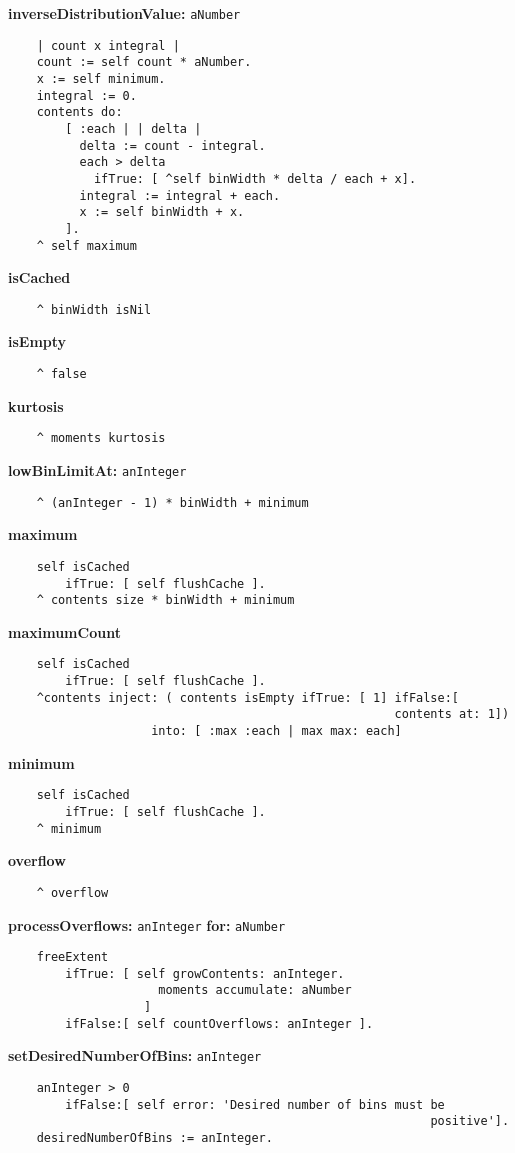 {\bf inverseDistributionValue:} {\tt aNumber}
\begin{verbatim}
    | count x integral |
    count := self count * aNumber.
    x := self minimum.
    integral := 0.
    contents do:
        [ :each | | delta |
          delta := count - integral.
          each > delta
            ifTrue: [ ^self binWidth * delta / each + x].
          integral := integral + each.
          x := self binWidth + x.
        ].
    ^ self maximum
\end{verbatim}
{\bf isCached}
\begin{verbatim}
    ^ binWidth isNil
\end{verbatim}
{\bf isEmpty}
\begin{verbatim}
    ^ false
\end{verbatim}
{\bf kurtosis}
\begin{verbatim}
    ^ moments kurtosis
\end{verbatim}
{\bf lowBinLimitAt:} {\tt anInteger}
\begin{verbatim}
    ^ (anInteger - 1) * binWidth + minimum
\end{verbatim}
{\bf maximum}
\begin{verbatim}
    self isCached
        ifTrue: [ self flushCache ].
    ^ contents size * binWidth + minimum
\end{verbatim}
{\bf maximumCount}
\begin{verbatim}
    self isCached
        ifTrue: [ self flushCache ].
    ^contents inject: ( contents isEmpty ifTrue: [ 1] ifFalse:[ 
                                                      contents at: 1])
                    into: [ :max :each | max max: each]
\end{verbatim}
{\bf minimum}
\begin{verbatim}
    self isCached
        ifTrue: [ self flushCache ].
    ^ minimum
\end{verbatim}
{\bf overflow}
\begin{verbatim}
    ^ overflow
\end{verbatim}
{\bf processOverflows:} {\tt anInteger} {\bf for:} {\tt aNumber}
\begin{verbatim}
    freeExtent
        ifTrue: [ self growContents: anInteger.
                     moments accumulate: aNumber
                   ]
        ifFalse:[ self countOverflows: anInteger ].
\end{verbatim}
{\bf setDesiredNumberOfBins:} {\tt anInteger}
\begin{verbatim}
    anInteger > 0
        ifFalse:[ self error: 'Desired number of bins must be 
                                                           positive'].
    desiredNumberOfBins := anInteger.
\end{verbatim}
